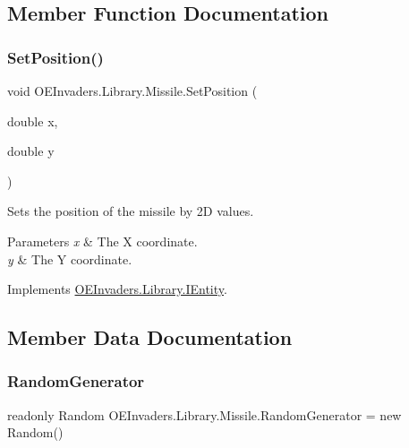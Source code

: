 \subsection{Member Function Documentation}
\mbox{\label{class_o_e_invaders_1_1_library_1_1_missile_a20c94264f05e7eb7b8e72a07b1a849ea}} 
\subsubsection{\texorpdfstring{SetPosition()}{SetPosition()}}
{\footnotesize\ttfamily void O\+E\+Invaders.\+Library.\+Missile.\+Set\+Position (\begin{DoxyParamCaption}\item[{double}]{x,  }\item[{double}]{y }\end{DoxyParamCaption})}



Sets the position of the missile by 2D values. 


\begin{DoxyParams}{Parameters}
{\em x} & The X coordinate.\\
\hline
{\em y} & The Y coordinate.\\
\hline
\end{DoxyParams}


Implements \mbox{\hyperlink{interface_o_e_invaders_1_1_library_1_1_i_entity_ae2cf61539ba662a6793fef01abcad2ef}{O\+E\+Invaders.\+Library.\+I\+Entity}}.



\subsection{Member Data Documentation}
\mbox{\label{class_o_e_invaders_1_1_library_1_1_missile_a97fb88bef6f6bc3bc8189f07852d6649}} 
\subsubsection{\texorpdfstring{RandomGenerator}{RandomGenerator}}
{\footnotesize\ttfamily readonly Random O\+E\+Invaders.\+Library.\+Missile.\+Random\+Generator = new Random()\hspace{0.3cm}{\ttfamily [static]}}




